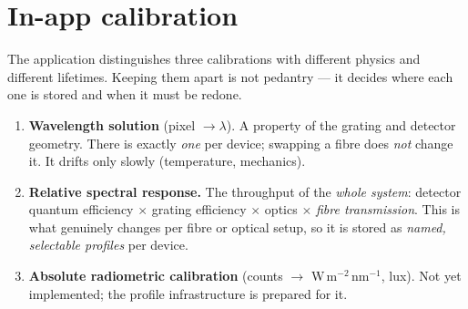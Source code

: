 %      

\section{In-app calibration}
\label{sec:calibration}

The application distinguishes three calibrations with different physics and
different lifetimes. Keeping them apart is not pedantry --- it decides where
each one is stored and when it must be redone.

\begin{enumerate}
  \item \textbf{Wavelength solution} (pixel $\to\lambda$). A property of the
        grating and detector geometry. There is exactly \emph{one} per device;
        swapping a fibre does \emph{not} change it. It drifts only slowly
        (temperature, mechanics).
  \item \textbf{Relative spectral response.} The throughput of the
        \emph{whole system}: detector quantum efficiency $\times$ grating
        efficiency $\times$ optics $\times$ \emph{fibre transmission}. This is
        what genuinely changes per fibre or optical setup, so it is stored as
        \emph{named, selectable profiles} per device.
  \item \textbf{Absolute radiometric calibration} (counts $\to$
        W\,m$^{-2}$\,nm$^{-1}$, lux). Not yet implemented; the profile
        infrastructure is prepared for it.
\end{enumerate}


